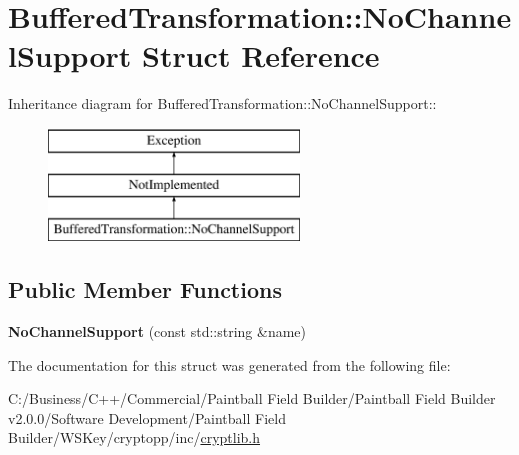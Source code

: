 \hypertarget{struct_buffered_transformation_1_1_no_channel_support}{
\section{BufferedTransformation::NoChannelSupport Struct Reference}
\label{struct_buffered_transformation_1_1_no_channel_support}
}
Inheritance diagram for BufferedTransformation::NoChannelSupport::\begin{figure}[H]
\begin{center}
\leavevmode
\includegraphics[height=3cm]{struct_buffered_transformation_1_1_no_channel_support}
\end{center}
\end{figure}
\subsection*{Public Member Functions}
\begin{DoxyCompactItemize}
\item 
\hypertarget{struct_buffered_transformation_1_1_no_channel_support_a9c73aeb6604ae66e7262c39ead571d4a}{
{\bfseries NoChannelSupport} (const std::string \&name)}
\label{struct_buffered_transformation_1_1_no_channel_support_a9c73aeb6604ae66e7262c39ead571d4a}

\end{DoxyCompactItemize}


The documentation for this struct was generated from the following file:\begin{DoxyCompactItemize}
\item 
C:/Business/C++/Commercial/Paintball Field Builder/Paintball Field Builder v2.0.0/Software Development/Paintball Field Builder/WSKey/cryptopp/inc/\hyperlink{cryptlib_8h}{cryptlib.h}\end{DoxyCompactItemize}
